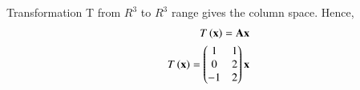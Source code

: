  Transformation T from $R^{3}$ to $R^{3}$ range gives the column space.
Hence,  
\begin{align}
   T\left(\mathbf{x}\right) = \mathbf{A}\mathbf{x}\\
    T\left(\mathbf{x}\right)=\begin{pmatrix}1&1\\0&2\\-1&2\end{pmatrix}\mathbf{x}
\end{align}


